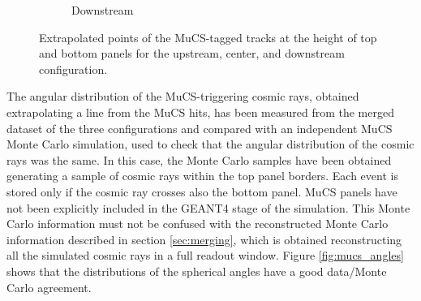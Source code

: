 \documentclass[a4paper]{scrartcl}
\begin{document}
\begin{figure}[htbp]
\begin{subfigure}{0.32\textwidth}
    \caption{Downstream} \label{fig:downstream_align}
  \end{subfigure}

  \caption{Extrapolated points of the MuCS-tagged tracks at the height of top and bottom panels for the upstream, center, and downstream configuration.} \label{fig:alignment}
\end{figure}

The angular distribution of the MuCS-triggering cosmic rays, obtained extrapolating a line from the MuCS hits, has been measured from the merged dataset of the three configurations and compared with an independent MuCS Monte Carlo simulation, used to check that the angular distribution of the cosmic rays was the same.  In this case, the Monte Carlo samples have been obtained generating a sample of cosmic rays within the top panel borders. Each event is stored only if the cosmic ray crosses also the bottom panel. MuCS panels have not been explicitly included in the GEANT4 stage of the simulation. This Monte Carlo information must not be confused with the reconstructed Monte Carlo information described in section \ref{sec:merging}, which is obtained reconstructing all the simulated cosmic rays in a full readout window. Figure \ref{fig:mucs_angles} shows that the distributions of the spherical angles have a good data/Monte Carlo agreement.
\end{document}
